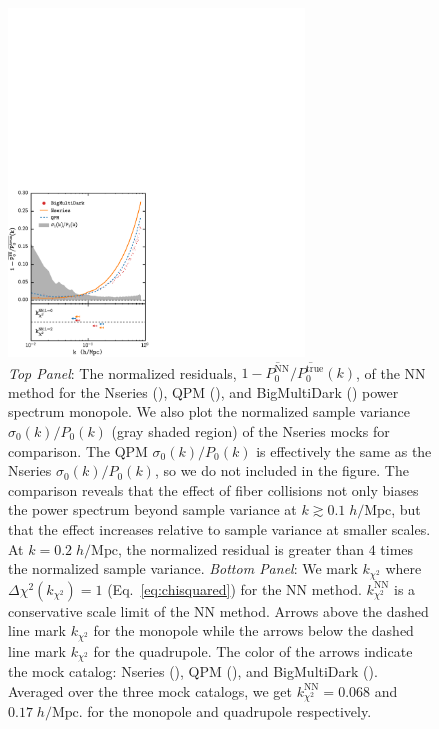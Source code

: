 \begin{figure}
\begin{center}
\includegraphics[width=0.7\textwidth]{figs/fc/mock_catalog_NN_true_P0k_norm_resid_rebin6x.pdf} 
\caption{{\it Top Panel}: The normalized residuals, 
$1 - \overline{P_0^\mathrm{NN}}/\overline{P_0^\mathrm{true}}(k)$, 
of the NN method for the Nseries (\nseriescolor), 
QPM (\qpmcolor), and BigMultiDark (\bmdcolor) power spectrum monopole. 
We also plot the normalized sample variance $\sigma_0(k) / P_0(k)$ 
(gray shaded region) of the Nseries mocks for comparison.
The QPM $\sigma_0(k) / P_0(k)$ is effectively the same as the Nseries 
$\sigma_0(k)/P_0(k)$, so we do not included in the figure. 
The comparison reveals that the effect of fiber collisions not only 
biases the power spectrum beyond sample variance at $k \gtrsim 0.1 \;h/\mathrm{Mpc}$, 
but that the effect increases relative to sample variance at smaller scales. At 
$k = 0.2\;h/\mathrm{Mpc}$,  
the normalized residual is greater than $4$ times the normalized sample variance.
{\it Bottom Panel}: We mark $k_{\chi^2}$ where $\Delta \chi^2(k_{\chi^2}) = 1$ (Eq.~\ref{eq:chisquared}) for the NN method. $k^\mathrm{NN}_{\chi^2}$ is a conservative 
scale limit of the NN method. Arrows above the dashed 
line mark $k_{\chi^2}$ for the monopole while the arrows below the dashed line mark
$k_{\chi^2}$ for the quadrupole. The color of the arrows indicate the mock catalog: 
Nseries (\nseriescolor), QPM (\qpmcolor), and BigMultiDark (\bmdcolor). Averaged
over the three mock catalogs, we get $k^\mathrm{NN}_{\chi^2} = 0.068$ and $0.17 \;h/\mathrm{Mpc}$.
for the monopole and quadrupole respectively.}
\label{fig:NN_norm_resid}
\end{center}
\end{figure}
